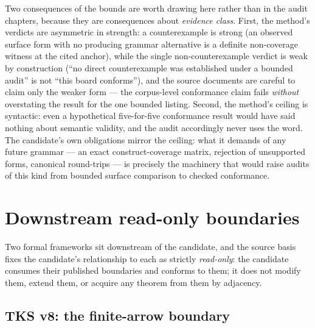 Two consequences of the bounds are worth drawing here rather than in
the audit chapters, because they are consequences about \emph{evidence
class}. First, the method's verdicts are asymmetric in strength: a
counterexample is strong (an observed surface form with no producing
grammar alternative is a definite non-coverage witness at the cited
anchor), while the single non-counterexample verdict is weak by
construction (``no direct counterexample was established under a
bounded audit'' is not ``this board conforms''), and the source
documents are careful to claim only the weaker form --- the
corpus-level conformance claim fails \emph{without} overstating the
result for the one bounded listing. Second, the method's ceiling is
syntactic: even a hypothetical five-for-five conformance result would
have said nothing about semantic validity, and the audit accordingly
never uses the word. The candidate's own obligations mirror the
ceiling: what it demands of any future grammar --- an exact
construct-coverage matrix, rejection of unsupported forms, canonical
round-trips --- is precisely the machinery that would raise audits of
this kind from bounded surface comparison to checked conformance.

\section{Downstream read-only boundaries}\label{ch03:boundaries}

Two formal frameworks sit downstream of the candidate, and the source
basis fixes the candidate's relationship to each as strictly
\emph{read-only}: the candidate consumes their published boundaries and
conforms to them; it does not modify them, extend them, or acquire any
theorem from them by adjacency.

\subsection{TKS v8: the finite-arrow boundary}\label{ch03:boundaries:tks}

